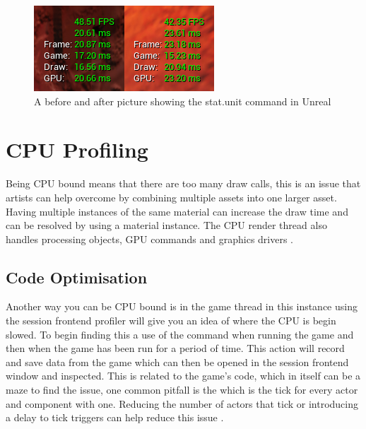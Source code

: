 \documentclass{scrartcl}
\begin{document}
\begin{figure}[h]
	\centering
	\includegraphics{Image1}
	\caption{A before and after picture showing the stat.unit command in Unreal}
	\label{Image1}
\end{figure}

\section{CPU Profiling}
Being CPU bound means that there are too many draw calls, this is an issue that artists can help overcome by combining multiple assets into one larger asset. Having multiple instances of the same material can increase the draw time and can be resolved by using a material instance. The CPU render thread also handles processing objects, GPU commands and graphics drivers \cite{UECPU}.

\subsection{Code Optimisation}
Another way you can be CPU bound is in the game thread in this instance using the session frontend profiler will give you an idea of where the CPU is begin slowed. To begin finding this a use of the command  when running the game and then  when the game has been run for a period of time. This action will record and save data from the game which can then be opened in the session frontend window and inspected. This is related to the game's code, which in itself can be a maze to find the issue, one common pitfall is the  which is the tick for every actor and component with one. Reducing the number of actors that tick or introducing a delay to tick triggers can help reduce this issue \cite{BlogUnreal}.
\end{document}
